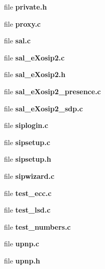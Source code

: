 \begin{DoxyCompactItemize}
file {\bfseries private.\-h}
\item 
file {\bfseries proxy.\-c}
\item 
file {\bfseries sal.\-c}
\item 
file {\bfseries sal\-\_\-e\-Xosip2.\-c}
\item 
file {\bfseries sal\-\_\-e\-Xosip2.\-h}
\item 
file {\bfseries sal\-\_\-e\-Xosip2\-\_\-presence.\-c}
\item 
file {\bfseries sal\-\_\-e\-Xosip2\-\_\-sdp.\-c}
\item 
file {\bfseries siplogin.\-c}
\item 
file {\bfseries sipsetup.\-c}
\item 
file {\bfseries sipsetup.\-h}
\item 
file {\bfseries sipwizard.\-c}
\item 
file {\bfseries test\-\_\-ecc.\-c}
\item 
file {\bfseries test\-\_\-lsd.\-c}
\item 
file {\bfseries test\-\_\-numbers.\-c}
\item 
file {\bfseries upnp.\-c}
\item 
file {\bfseries upnp.\-h}
\end{DoxyCompactItemize}

